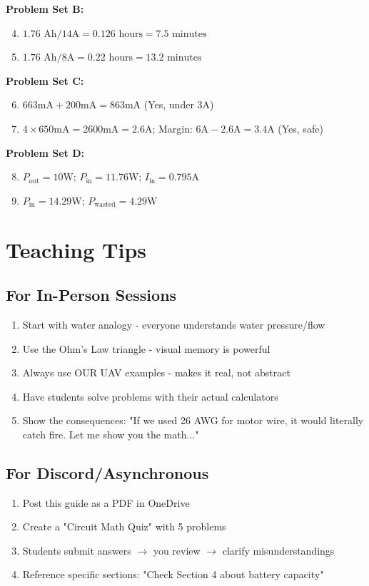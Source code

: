 \documentclass[11pt,letterpaper]{article}
\begin{document}
\textbf{Problem Set B:}
\begin{enumerate}
  \setcounter{enumi}{3}
  \item $1.76\text{ Ah} / 14\text{A} = 0.126\text{ hours} = 7.5\text{ minutes}$
  \item $1.76\text{ Ah} / 8\text{A} = 0.22\text{ hours} = 13.2\text{ minutes}$
\end{enumerate}

\textbf{Problem Set C:}
\begin{enumerate}
  \setcounter{enumi}{5}
  \item $663\text{mA} + 200\text{mA} = 863\text{mA}$ (Yes, under 3A)
  \item $4 \times 650\text{mA} = 2600\text{mA} = 2.6\text{A}$; Margin: $6\text{A} - 2.6\text{A} = 3.4\text{A}$ (Yes, safe)
\end{enumerate}

\textbf{Problem Set D:}
\begin{enumerate}
  \setcounter{enumi}{7}
  \item $P_{\text{out}} = 10\text{W}$; $P_{\text{in}} = 11.76\text{W}$; $I_{\text{in}} = 0.795\text{A}$
  \item $P_{\text{in}} = 14.29\text{W}$; $P_{\text{wasted}} = 4.29\text{W}$
\end{enumerate}

\section{Teaching Tips}

\subsection{For In-Person Sessions}
\begin{enumerate}
  \item Start with water analogy - everyone understands water pressure/flow
  \item Use the Ohm's Law triangle - visual memory is powerful
  \item Always use OUR UAV examples - makes it real, not abstract
  \item Have students solve problems with their actual calculators
  \item Show the consequences: "If we used 26 AWG for motor wire, it would literally catch fire. Let me show you the math..."
\end{enumerate}

\subsection{For Discord/Asynchronous}
\begin{enumerate}
  \item Post this guide as a PDF in OneDrive
  \item Create a "Circuit Math Quiz" with 5 problems
  \item Students submit answers $\rightarrow$ you review $\rightarrow$ clarify misunderstandings
  \item Reference specific sections: "Check Section 4 about battery capacity"
\end{enumerate}
\end{document}
